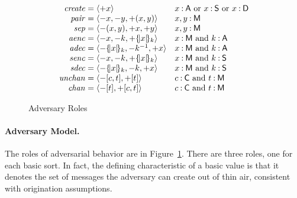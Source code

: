 \documentclass[12pt]{article}
\newcommand{\invk}[1]{{#1}^{-1}}
\newcommand{\typ}{\mathbin:}
\newcommand{\atom}{basic value}
\newcommand{\indefart}{a}
\begin{document}
\begin{figure}
  $$\begin{array}{r@{{}={}}ll}
    \fn{create}&\seq{\outbnd x}&
    \mbox{$x\typ\srt{A}$ or $x\typ\srt{S}$ or $x\typ\srt{D}$}\\
    \fn{pair}&
    \seq{\inbnd x,\inbnd y,\outbnd (x,y)}&
    x,y\typ\srt{M}\\
    \fn{sep}&
    \seq{\inbnd (x,y),\outbnd x,\outbnd y}&
    x,y\typ\srt{M}\\
    \fn{aenc}&
    \seq{\inbnd x,\inbnd k,\outbnd \enc{x}{k}}&
    \mbox{$x\typ\srt{M}$ and $k\typ\srt{A}$}\\
    \fn{adec}&
    \seq{\inbnd \enc{x}{k},\inbnd\invk{k},\outbnd x}&
    \mbox{$x\typ\srt{M}$ and $k\typ\srt{A}$}\\
    \fn{senc}&
    \seq{\inbnd x,\inbnd k,\outbnd \enc{x}{k}}&
    \mbox{$x\typ\srt{M}$ and $k\typ\srt{S}$}\\
    \fn{sdec}&
    \seq{\inbnd \enc{x}{k},\inbnd k,\outbnd x}&
    \mbox{$x\typ\srt{M}$ and $k\typ\srt{S}$}\\
    \fn{unchan}&
    \seq{\inbnd[c,t],\outbnd[t]}&
    \mbox{$c\typ\srt{C}$ and $t\typ\srt{M}$}\\
    \fn{chan}&
    \seq{\inbnd[t],\outbnd[c,t]}&
    \mbox{$c\typ\srt{C}$ and $t\typ\srt{M}$}
  \end{array}$$
  \caption{Adversary Roles}\label{fig:adversary}
\end{figure}

\paragraph{Adversary Model.}
The roles of adversarial behavior are in Figure~\ref{fig:adversary}.
There are three  roles, one for each basic sort.  In fact,
the defining characteristic of {\indefart} {\atom} is that it denotes
the set of messages the adversary can create out of thin air,
consistent with origination assumptions.
\end{document}
